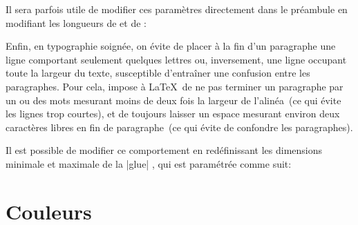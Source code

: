 Il sera parfois utile de modifier ces paramètres directement dans le préambule en modifiant les longueurs de  et de :

\begin{macro}
\setlength{\parskip}{0pt}%
\setlength{\parindent}{1.5em}%

\setlength{\parskip}{\baselineskip}%
\setlength{\parindent}{0em}%
\end{macro}

Enfin, en typographie soignée, on évite de placer à la fin d'un paragraphe une ligne comportant seulement quelques lettres ou, inversement, une ligne occupant toute la largeur du texte, susceptible d'entraîner une confusion entre les paragraphes. Pour cela, \frenchlaw impose à \LaTeX\ de ne pas terminer un paragraphe par un ou des mots mesurant moins de deux fois la largeur de l'alinéa~(ce qui évite les lignes trop courtes), et de toujours laisser un espace mesurant environ deux caractères libres en fin de paragraphe~(ce qui évite de confondre les paragraphes).

\begin{noprint}
\setlength{\parfillskip}{2ex plus \dimexpr\linewidth-3em}
\end{noprint}

\begin{developer}
Il est possible de modifier ce comportement en redéfinissant les dimensions minimale et maximale de la |glue| , qui est paramétrée comme suit:\par
\vspace{-\baselineskip}
\begin{macro}
\setlength{\parfillskip}{2ex plus \dimexpr\linewidth -3em}
\end{macro}
\end{developer}



\section{Couleurs}\label{Couleurs}

